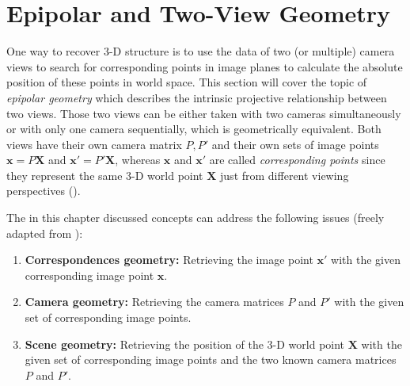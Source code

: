

\section{Epipolar and Two-View Geometry}
One way to recover 3-D structure is to use the data of two (or multiple) camera views to search for corresponding points in image planes to calculate the absolute position of these points in world space. This section will cover the topic of \textit{epipolar geometry} which describes the intrinsic projective relationship between two views. Those two views can be either taken with two cameras simultaneously or with only one camera sequentially, which is geometrically equivalent. Both views have their own camera matrix $P,P'$ and their own sets of image points $\mathbf{x}=P\mathbf{X}$ and $\mathbf{x'}=P'\mathbf{X}$, whereas $\mathbf{x}$ and $\mathbf{x'}$ are called \textit{corresponding points} since they represent the same 3-D world point $\mathbf{X}$ just from different viewing perspectives (\cite[p.238]{Hartley.2011}).

The in this chapter discussed concepts can address the following issues (freely adapted from \cite[p.238]{Hartley.2011}):
\begin{enumerate}[i]
\item \textbf{Correspondences geometry:} Retrieving the image point $\mathbf{x'}$ with the given corresponding image point $\mathbf{x}$.
\item \textbf{Camera geometry:} Retrieving the camera matrices $P$ and $P'$ with the given set of corresponding image points. 
\item \textbf{Scene geometry:} Retrieving the position of the 3-D world point $\mathbf{X}$ with the given set of corresponding image points and the two known camera matrices $P$ and $P'$. 
\end{enumerate}

